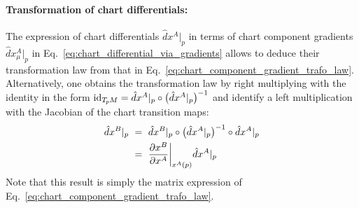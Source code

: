 \paragraph{Transformation of chart differentials:}
The expression of chart differentials $\hat{d}x^A|_p$ in terms of chart component gradients $\hat{d}x^A_\mu|_p$ in Eq.~\eqref{eq:chart_differential_via_gradients} allows to deduce their transformation law from that in Eq.~\eqref{eq:chart_component_gradient_trafo_law}.
Alternatively, one obtains the transformation law by right multiplying with the identity in the form $\mathrm{id}_{T_{\mkern-1.5mu p}\mkern-.5muM} = \hat{d}x^A|_p \circ \big( \hat{d}x^A|_p \big)^{-1}$ and identify a left multiplication with the Jacobian of the chart transition maps:
\begin{align}\label{eq:chart_differential_trafo_law}
    \hat{d}x^B|_p
    \ &=\ \hat{d}x^B|_p \circ \big( \hat{d}x^A|_p \big)^{-1} \circ \hat{d}x^A|_p \notag \\
    \ &=\ \frac{\partial x^B}{\partial x^A} \bigg|_{x^A(p)} \hat{d}x^A|_p
\end{align}
Note that this result is simply the matrix expression of Eq.~\eqref{eq:chart_component_gradient_trafo_law}.



